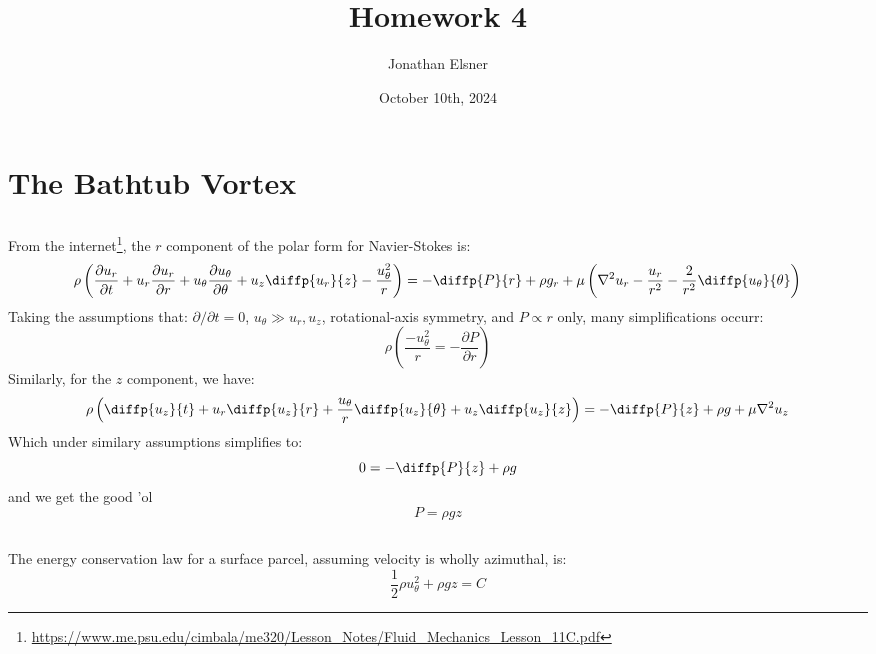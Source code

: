 \documentclass{article}
\title{Homework 4}
\author{Jonathan Elsner}
\date{October 10th, 2024}
\begin{document}
\maketitle

\section{The Bathtub Vortex}

\subsection{}
From the internet\footnote{\url{https://www.me.psu.edu/cimbala/me320/Lesson_Notes/Fluid_Mechanics_Lesson_11C.pdf}},
the \(r\) component of the polar form for Navier-Stokes is:
\[\rho \left(\frac{\partial u_r}{\partial t} + u_r \frac{\partial u_r}{\partial r} + u_\theta \frac{\partial u_\theta}{\partial \theta} + u_z \diffp{u_r}{z} - \frac{u_\theta^2}{r} \right) = -\diffp{P}{r} + \rho g_r + \mu \left(\nabla^2 u_r - \frac{u_r}{r^2} - \frac{2}{r^2} \diffp{u_\theta}{\theta}\right)\]
Taking the assumptions that: \(\partial/\partial t = 0\), \(u_\theta \gg u_r, u_z\), rotational-axis symmetry, and \(P \propto r\) only, many simplifications occurr:
\[\rho \left(\frac{- u_\theta^2}{r} = - \frac{\partial P}{\partial r}\right)\]
Similarly, for the \(z\) component, we have:
\[\rho \left(\diffp{u_z}{t} + u_r \diffp{u_z}{r} + \frac{u_\theta}{r} \diffp{u_z}{\theta} + u_z \diffp{u_z}{z}\right) =  - \diffp{P}{z} + \rho g + \mu \nabla^2 u_z\]
Which under similary assumptions simplifies to:
\[0 = - \diffp{P}{z} + \rho g\]
and we get the good 'ol
\[P = \rho gz \]

\subsection{}

The energy conservation law for a surface parcel, assuming velocity is wholly azimuthal, is:
\[\frac{1}{2} \rho u_\theta^2 + \rho g z = C\]
\end{document}
